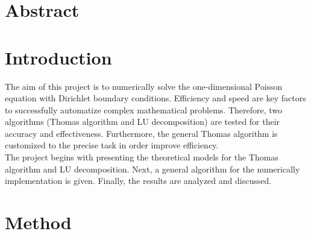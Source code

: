 \documentclass[%
oneside,                 %
final,                   %
10pt]{article}
\begin{document}





\newcommand{\exercisesection}[1]{\subsection*{#1}}






\thispagestyle{empty}


\section*{Abstract}


\section*{Introduction}
The aim of this project is to numerically solve the one-dimensional Poisson equation with Dirichlet boundary conditions. 
Efficiency and speed are key factors to successfully automatize complex mathematical problems. 
Therefore, two algorithms (Thomas algorithm and LU decomposition) are tested for their accuracy and effectiveness. 
Furthermore, the general Thomas algorithm is customized to the precise task in order improve efficiency. \\
The project begins with presenting the theoretical models for the Thomas algorithm and LU decomposition. 
Next, a general algorithm for the numerically implementation is given.
Finally, the results are analyzed and discussed. 

\section*{Method}
\end{document}
